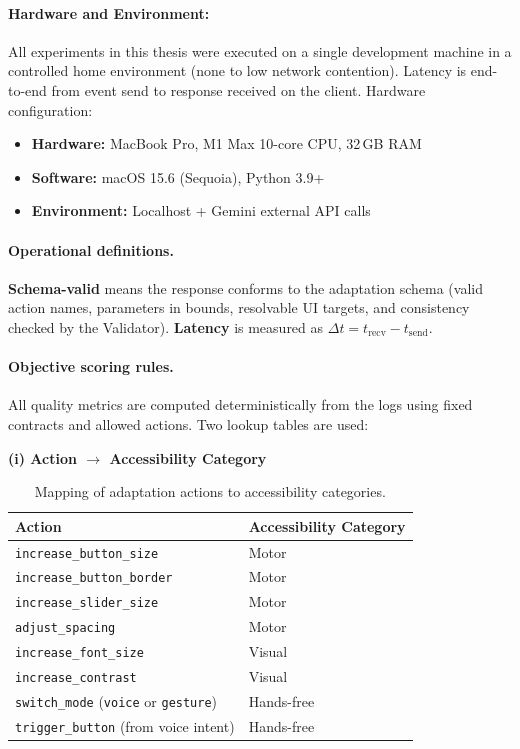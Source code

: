 \paragraph{Hardware and Environment:}
All experiments in this thesis were executed on a single development machine in a controlled home environment (none to low network contention). Latency is end-to-end from event send to response received on the client.
Hardware configuration:
\begin{itemize}
    \item \textbf{Hardware:} MacBook Pro, M1 Max 10-core CPU, 32\,GB RAM
    \item \textbf{Software:} macOS 15.6 (Sequoia), Python 3.9+
    \item \textbf{Environment:} Localhost + Gemini external API calls
\end{itemize}

\paragraph{Operational definitions.}
\textbf{Schema-valid} means the response conforms to the adaptation schema (valid action names, parameters in bounds, resolvable UI targets, and consistency checked by the Validator). \textbf{Latency} is measured as $\Delta t = t_{\text{recv}} - t_{\text{send}}$.

\paragraph{Objective scoring rules.}
All quality metrics are computed deterministically from the logs using fixed contracts and allowed actions. Two lookup tables are used:

\noindent\textbf{(i) Action $\rightarrow$ Accessibility Category}

\begin{table}[H]
\centering
\small
\renewcommand{\arraystretch}{1.3}
\caption{Mapping of adaptation actions to accessibility categories.}
\begin{tabular}{ll}
\toprule
\textbf{Action} & \textbf{Accessibility Category} \\
\midrule
\texttt{increase\_button\_size}      & Motor \\
\texttt{increase\_button\_border}    & Motor \\
\texttt{increase\_slider\_size}      & Motor \\
\texttt{adjust\_spacing}             & Motor \\
\texttt{increase\_font\_size}        & Visual \\
\texttt{increase\_contrast}          & Visual \\
\texttt{switch\_mode} (\texttt{voice} or \texttt{gesture}) & Hands-free \\
\texttt{trigger\_button} (from voice intent) & Hands-free \\
\bottomrule
\end{tabular}
\end{table}

